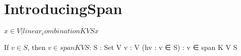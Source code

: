 \section{IntroducingSpan}


\begin{definition}
  \label{definition : span}
  \leanok
  ${ x \in V | linear_combination K V S x }$
\end{definition}

\begin{theorem}
  \label{theorem : mem_span_of_mem}
  \leanok
  If $v \in S$, then $v \in span K V S$: {S : Set V} {v : V} (hv : v ∈ S) : v ∈ span K V S
\end{theorem}
